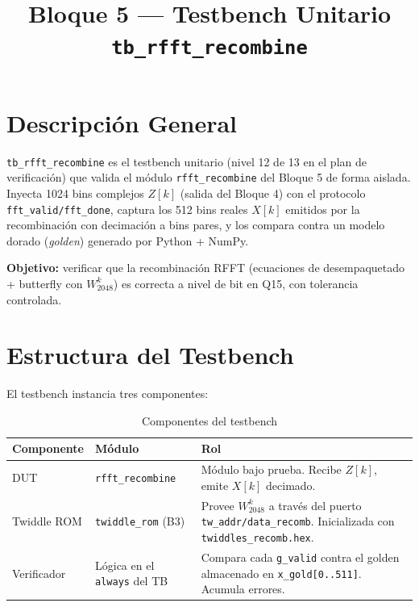 \documentclass[12pt, a4paper]{article}
\title{\textbf{Bloque 5 — Testbench Unitario}\\
       \large \texttt{tb\_rfft\_recombine}}
\author{}
\date{}
\begin{document}
\maketitle
\tableofcontents
\newpage

\section{Descripción General}

\texttt{tb\_rfft\_recombine} es el testbench unitario (nivel 12 de 13 en el
plan de verificación) que valida el módulo \texttt{rfft\_recombine} del
Bloque 5 de forma aislada. Inyecta 1024 bins complejos $Z[k]$ (salida del
Bloque 4) con el protocolo \texttt{fft\_valid/fft\_done}, captura los 512
bins reales $X[k]$ emitidos por la recombinación con decimación a bins
pares, y los compara contra un modelo dorado (\emph{golden}) generado por
Python + NumPy.

\textbf{Objetivo:} verificar que la recombinación RFFT (ecuaciones de
desempaquetado + butterfly con $W_{2048}^k$) es correcta a nivel de bit en
Q15, con tolerancia controlada.

\section{Estructura del Testbench}

El testbench instancia tres componentes:

\begin{table}[H]
\centering
\caption{Componentes del testbench}
\begin{tabular}{p{3.5cm} p{2.8cm} p{8cm}}
\toprule
\textbf{Componente} & \textbf{Módulo} & \textbf{Rol} \\
\midrule
DUT & \texttt{rfft\_recombine} &
  Módulo bajo prueba. Recibe $Z[k]$, emite $X[k]$ decimado. \\
Twiddle ROM & \texttt{twiddle\_rom} (B3) &
  Provee $W_{2048}^k$ a través del puerto \texttt{tw\_addr/data\_recomb}.
  Inicializada con \texttt{twiddles\_recomb.hex}. \\
Verificador & Lógica en el \texttt{always} del TB &
  Compara cada \texttt{g\_valid} contra el golden almacenado en
  \texttt{x\_gold[0..511]}. Acumula errores. \\
\bottomrule
\end{tabular}
\end{table}
\end{document}
